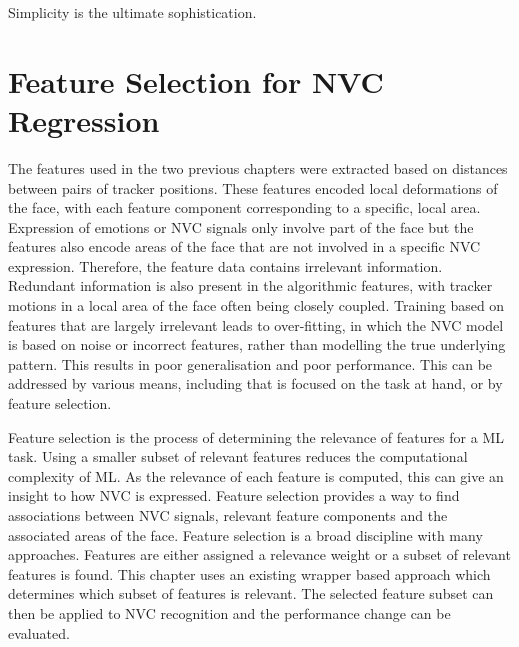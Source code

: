 \begin{savequote}
Simplicity is the ultimate sophistication.
\end{savequote}

\chapter[Feature Selection for NVC Regression]{Feature Selection for NVC Regression}
\label{ChapterFeatureSelection}




The features used in the two previous chapters were extracted based on distances between pairs of tracker positions. These features encoded local deformations of the face, with each feature component corresponding to a specific, local area. 
Expression of emotions or \ac{NVC} signals only involve part of the face but the features also encode areas of the face that are not involved in a specific \ac{NVC} expression. Therefore, the feature data contains irrelevant information. Redundant information is also present in the algorithmic features, with tracker motions in a local area of the face often being closely coupled. Training based on features that are largely irrelevant leads to over-fitting, in which the \ac{NVC} model is based on noise or incorrect features, rather than modelling the true underlying pattern. This results in poor generalisation and poor performance. This can be addressed by various means, including \featureGeneration that is focused on the task at hand, or by feature selection. 

Feature selection is the process of determining the relevance of features for a \ac{ML} task. Using a smaller subset of relevant features reduces the computational complexity of \ac{ML}. As the relevance of each feature is computed, this can give an insight to how \ac{NVC} is expressed. Feature selection provides a way to find associations between \ac{NVC} signals, relevant feature components and the associated areas of the face. Feature selection is a broad discipline with many approaches.
Features are either assigned a relevance weight or a subset of relevant features is found. This chapter uses an existing wrapper based approach which determines which subset of features is relevant. The selected feature subset can then be applied to \ac{NVC} recognition and the performance change can be evaluated.

